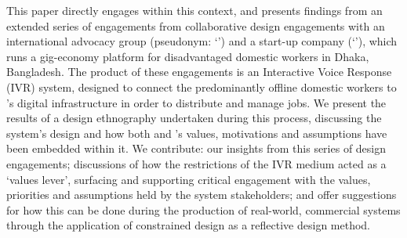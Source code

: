 This paper directly engages within this context, and presents findings from an extended series of engagements from collaborative design engagements with an international advocacy group (pseudonym: `\NGO{}') and a start-up company (`\PC{}'), which runs a gig-economy platform for disadvantaged domestic workers in Dhaka, Bangladesh. The product of these engagements is an Interactive Voice Response (IVR) system, designed to connect the predominantly offline domestic workers to \PC{}'s digital infrastructure in order to distribute and manage jobs. We present the results of a design ethnography undertaken during this process, discussing the system's design and how both \NGO{} and \PC{}'s values, motivations and assumptions have been embedded within it. We contribute: our insights from this series of design engagements; discussions of how the restrictions of the IVR medium acted as a `values lever', surfacing and supporting critical engagement with the values, priorities and assumptions held by the system stakeholders; and offer suggestions for how this can be done during the production of real-world, commercial systems through the application of constrained design as a reflective design method.


